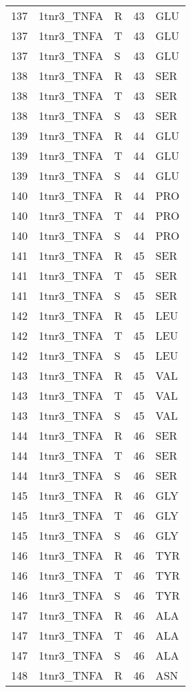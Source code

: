\begin{tiny}
\begin{longtable}[l]{l|l|l|l|l}
	137 & 1tnr3\_TNFA & R & 43 & GLU \\
	137 & 1tnr3\_TNFA & T & 43 & GLU \\
	137 & 1tnr3\_TNFA & S & 43 & GLU \\
	138 & 1tnr3\_TNFA & R & 43 & SER \\
	138 & 1tnr3\_TNFA & T & 43 & SER \\
	138 & 1tnr3\_TNFA & S & 43 & SER \\
	139 & 1tnr3\_TNFA & R & 44 & GLU \\
	139 & 1tnr3\_TNFA & T & 44 & GLU \\
	139 & 1tnr3\_TNFA & S & 44 & GLU \\
	140 & 1tnr3\_TNFA & R & 44 & PRO \\
	140 & 1tnr3\_TNFA & T & 44 & PRO \\
	140 & 1tnr3\_TNFA & S & 44 & PRO \\
	141 & 1tnr3\_TNFA & R & 45 & SER \\
	141 & 1tnr3\_TNFA & T & 45 & SER \\
	141 & 1tnr3\_TNFA & S & 45 & SER \\
	142 & 1tnr3\_TNFA & R & 45 & LEU \\
	142 & 1tnr3\_TNFA & T & 45 & LEU \\
	142 & 1tnr3\_TNFA & S & 45 & LEU \\
	143 & 1tnr3\_TNFA & R & 45 & VAL \\
	143 & 1tnr3\_TNFA & T & 45 & VAL \\
	143 & 1tnr3\_TNFA & S & 45 & VAL \\
	144 & 1tnr3\_TNFA & R & 46 & SER \\
	144 & 1tnr3\_TNFA & T & 46 & SER \\
	144 & 1tnr3\_TNFA & S & 46 & SER \\
	145 & 1tnr3\_TNFA & R & 46 & GLY \\
	145 & 1tnr3\_TNFA & T & 46 & GLY \\
	145 & 1tnr3\_TNFA & S & 46 & GLY \\
	146 & 1tnr3\_TNFA & R & 46 & TYR \\
	146 & 1tnr3\_TNFA & T & 46 & TYR \\
	146 & 1tnr3\_TNFA & S & 46 & TYR \\
	147 & 1tnr3\_TNFA & R & 46 & ALA \\
	147 & 1tnr3\_TNFA & T & 46 & ALA \\
	147 & 1tnr3\_TNFA & S & 46 & ALA \\
	148 & 1tnr3\_TNFA & R & 46 & ASN \\

\end{longtable}
\end{tiny}
